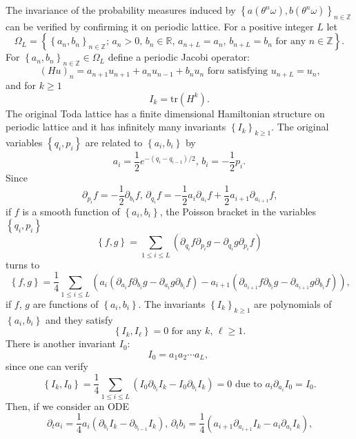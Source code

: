 \documentclass[a4paper]{article}%
\begin{document}
The invariance of the probability measures induced by $\left\{  a\left(
\theta^{n}\omega\right)  ,b\left(  \theta^{n}\omega\right)  \right\}
_{n\in\mathbb{Z}}$ can be verified by confirming it on periodic lattice. For a
positive integer $L$ let%
\[
\Omega_{L}=\left\{  \left\{  a_{n},b_{n}\right\}  _{n\in\mathbb{Z}}\text{;
\ }a_{n}>0\text{, }b_{n}\in\mathbb{R}\text{, }a_{n+L}=a_{n}\text{, }%
b_{n+L}=b_{n}\text{ for any }n\in\mathbb{Z}\right\}  \text{.}%
\]
For $\left\{  a_{n},b_{n}\right\}  _{n\in\mathbb{Z}}\in\Omega_{L}$ define a
periodic Jacobi operator:%
\[
\left(  Hu\right)  _{n}=a_{n+1}u_{n+1}+a_{n}u_{n-1}+b_{n}u_{n}\text{ for
}u\text{ satisfying }u_{n+L}=u_{n}\text{,}%
\]
and for $k\geq1$
\[
I_{k}=\mathrm{tr}\left(  H^{k}\right)  \text{.}%
\]
The original Toda lattice has a finite dimensional Hamiltonian structure on
periodic lattice and it has infinitely many invariants $\left\{
I_{k}\right\}  _{k\geq1}$. The original variables $\left\{  q_{i}%
,p_{i}\right\}  $ are related to $\left\{  a_{i},b_{i}\right\}  $ by%
\[
a_{i}=\dfrac{1}{2}e^{-\left(  q_{i}-q_{i-1}\right)  /2}\text{, \ \ \ }%
b_{i}=-\dfrac{1}{2}p_{i}\text{.}%
\]
Since%
\[
\partial_{p_{i}}f=-\dfrac{1}{2}\partial_{b_{i}}f\text{, \ \ }\partial_{q_{i}%
}f=-\dfrac{1}{2}a_{i}\partial_{a_{i}}f+\dfrac{1}{2}a_{i+1}\partial_{a_{i+1}%
}f\text{,}%
\]
if $f$ is a smooth function of $\left\{  a_{i},b_{i}\right\}  $, the Poisson
bracket in the variables $\left\{  q_{i},p_{i}\right\}  $%
\[
\left\{  f,g\right\}  =\sum_{1\leq i\leq L}\left(  \partial_{q_{i}}%
f\partial_{p_{i}}g-\partial_{q_{i}}g\partial_{p_{i}}f\right)
\]
turns to%
\[
\left\{  f,g\right\}  =\dfrac{1}{4}\sum_{1\leq i\leq L}\left(  a_{i}\left(
\partial_{a_{i}}f\partial_{b_{i}}g-\partial_{a_{i}}g\partial_{b_{i}}f\right)
-a_{i+1}\left(  \partial_{a_{i+1}}f\partial_{b_{i}}g-\partial_{a_{i+1}%
}g\partial_{b_{i}}f\right)  \right)  \text{,}%
\]
if $f$, $g$ are functions of $\left\{  a_{i},b_{i}\right\}  $. The invariants
$\left\{  I_{k}\right\}  _{k\geq1}$ are polynomials of $\left\{  a_{i}%
,b_{i}\right\}  $ and they satisfy%
\[
\left\{  I_{k},I_{\ell}\right\}  =0\text{ \ for any }k\text{, }\ell
\geq1\text{.}%
\]
There is another invariant $I_{0}$:%
\[
I_{0}=a_{1}a_{2}\cdots a_{L}\text{, }%
\]
since one can verify%
\[
\left\{  I_{k},I_{0}\right\}  =\dfrac{1}{4}\sum_{1\leq i\leq L}\left(
I_{0}\partial_{b_{i}}I_{k}-I_{0}\partial_{b_{i}}I_{k}\right)  =0\text{ \ due
to }a_{i}\partial_{a_{i}}I_{0}=I_{0}\text{.}%
\]
Then, if we consider an ODE%
\begin{equation}
\partial_{t}a_{i}=\dfrac{1}{4}a_{i}\left(  \partial_{b_{i}}I_{k}%
-\partial_{b_{i-1}}I_{k}\right)  \text{, \ \ }\partial_{t}b_{i}=\dfrac{1}%
{4}\left(  a_{i+1}\partial_{a_{i+1}}I_{k}-a_{i}\partial_{a_{i}}I_{k}\right)
\text{,} \label{4-15}%
\end{equation}
\end{document}
